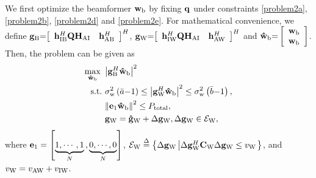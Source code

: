 \documentclass[10pt,journal,letterpaper,twocolumn,twoside]{IEEEtran} %
\begin{document}
We first optimize the beamformer ${{\mathbf{w}}_{\rm{b}}}$  by fixing ${\bf{q}}$
 under constraints \eqref{problem2a}, \eqref{problem2b}, \eqref{problem2d} and \eqref{problem2e}.
For mathematical convenience, we define ${{\bf{g}}_{\rm{B}}}{\rm{ = }}{\left[ {\begin{array}{*{20}{c}}
{{\bf{h}}_{{\rm{IB}}}^H{\bf{Q}}{{\bf{H}}_{{\rm{AI}}}}}&{{\bf{h}}_{{\rm{AB}}}^H}
\end{array}} \right]^H}$,
${{\bf{g}}_{\rm{W}}}{\rm{ = }}{\left[ {\begin{array}{*{20}{c}}
{{\bf{h}}_{{\rm{IW}}}^H{\bf{Q}}{{\bf{H}}_{{\rm{AI}}}}}&{{\bf{h}}_{{\rm{AW}}}^H}
\end{array}} \right]^H}$
and ${{{\bf{\hat w}}}_{\rm{b}}}{\rm{ = }}\left[ {\begin{array}{*{20}{c}}
{{{\bf{w}}_{\rm{b}}}}\\
{{{\bf{w}}_{\rm{b}}}}
\end{array}} \right]$.
Then, the problem can be given as
\begin{subequations}\label{problem2sub1}
\begin{align}
\mathop {\max }\limits_{{{{\bf{\hat w}}}_{\rm{b}}}} {\rm{ }}~&{{{{\left| {{\bf{g}}_{\rm{B}}^H{{{\bf{\hat w}}}_{\rm{b}}}} \right|}^2}}} \\
  {\text{s}}{\text{.t}}{\text{.}}~&\sigma _{\rm{w}}^2\left( {\bar a{\rm{ - 1}}} \right) \le {\left| {{\bf{g}}_{\rm{W}}^H{{{\bf{\hat w}}}_{\rm{b}}}} \right|^{\rm{2}}} \le \sigma _{\rm{w}}^2\left( {\bar b{\rm{ - 1}}} \right), \label{constraint1}\hfill \\
&{\left\| {{{\bf{e}}_1}{{{\bf{\hat w}}}_{\rm{b}}}} \right\|^2} \le {P_{{\rm{total}}}},\\
&{{\bf{g}}_{\rm{W}}}  = {{{\bf{\hat g}}}_{\rm{W}}} + \Delta {{\bf{g}}_{\rm{W}}},\Delta {{\bf{g}}_{\rm{W}}} \in {{\cal E}_{\rm{W}}},
\end{align}
\end{subequations}
where  ${{\bf{e}}_1} = \left[ {\underbrace {1, \cdots ,{\rm{1}}}_N{\rm{,}}\underbrace {{\rm{0,}} \cdots {\rm{,0}}}_N} \right]$, ${{\cal E}_{\rm{W}}} \buildrel \Delta \over =\left\{ {\Delta {{\bf{g}}_{\rm{W}}}\left| {\Delta {\bf{g}}_{\rm{W}}^H{{\bf{C}}_{\rm{W}}}\Delta {{\bf{g}}_{\rm{W}}} \le {v_{\rm{W}}}} \right.} \right\}$, and  ${v_{\rm{W}}} = {v_{{\rm{AW}}}} + {v_{{\rm{IW}}}}$.
\end{document}
